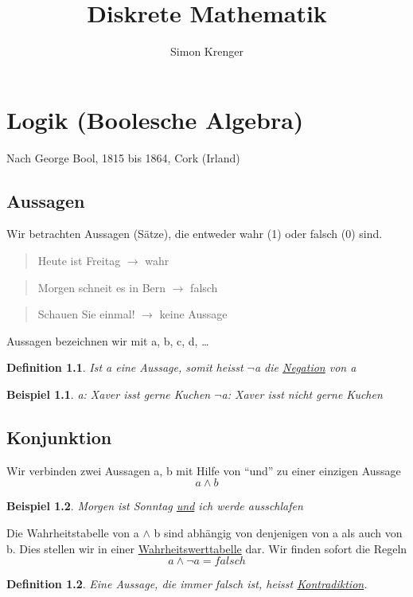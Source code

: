 \documentclass{report}
\title{Diskrete Mathematik}
\author{Simon Krenger}
\newtheorem{mydef}{Definition}
\newtheorem{myexample}{Beispiel}
\begin{document}
\maketitle
\chapter{Logik (Boolesche Algebra)}
Nach George Bool, 1815 bis 1864, Cork (Irland)
\section{Aussagen}
Wir betrachten Aussagen (Sätze), die entweder wahr (1) oder falsch (0) sind.

\begin{quote}Heute ist Freitag \(\to\) wahr\end{quote}
\begin{quote}Morgen schneit es in Bern \(\to\) falsch\end{quote}
\begin{quote}Schauen Sie einmal! \(\to\) keine Aussage\end{quote}
Aussagen bezeichnen wir mit a, b, c, d, …
\begin{mydef}
Ist a eine Aussage, somit heisst  \(\lnot\)a die \underline{Negation} von a
\end{mydef}
\begin{myexample}a: Xaver isst gerne Kuchen
\(\lnot\)a: Xaver isst nicht gerne Kuchen\end{myexample}

\section{Konjunktion}
Wir verbinden zwei Aussagen a, b mit Hilfe von “und” zu einer einzigen Aussage
\begin{equation}a \land b\end{equation}
\begin{myexample}Morgen ist Sonntag \underline{und} ich werde ausschlafen\end{myexample}

Die Wahrheitstabelle von a \(\land\) b sind abhängig von denjenigen von a als auch von b. Dies stellen wir in einer \underline{Wahrheitswerttabelle} dar. Wir finden sofort die Regeln
\begin{equation}a \land \lnot a = falsch\end{equation}


\begin{mydef}Eine Aussage, die immer falsch ist, heisst \underline{Kontradiktion}.\end{mydef}
\end{document}
